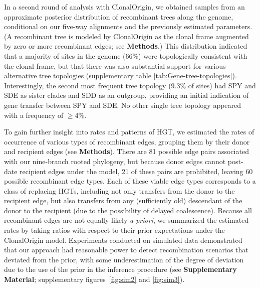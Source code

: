\documentclass[12pt]{article}
\begin{document}
In a second round of analysis with ClonalOrigin, we obtained samples from an
approximate posterior distribution of recombinant trees along the genome,
conditional on our five-way alignments and the previously estimated
parameters. (A recombinant tree is modeled by ClonalOrigin as the clonal
frame augmented by zero or more recombinant edges; see \textbf{Methods}.)
This distribution indicated that a majority of sites in the genome (66\%)
were topologically consistent with the clonal frame, but that there was
also substantial support for various alternative tree topologies (supplementary
table \ref{tab:Gene-tree-topologies}).  Interestingly, the second most
frequent tree topology (9.3\% of sites) had SPY and SDE as sister clades
and SDD as an outgroup, providing an initial indication of gene transfer
between SPY and SDE.  No other single tree topology appeared with a
frequency of $\geq$4\%.

To gain further insight into rates and patterns of HGT, we estimated the
rates of occurrence of various types of recombinant edges, grouping them by
their donor and recipient edges (see \textbf{Methods}).  There are 81
possible edge pairs associated with our nine-branch rooted phylogeny, but
because donor edges cannot post-date recipient edges under the model, 21 of
these pairs are prohibited, leaving 60 possible recombinant edge types.
Each of these viable edge types corresponds to a class of replacing HGTs,
including not only transfers from the donor to the recipient edge, but also
transfers from any (sufficiently old) descendant of the donor to the
recipient (due to the possibility of delayed coalescence).  Because all
recombinant edges are not equally likely \textit{a priori}, we summarized
the estimated rates by taking ratios with respect to their prior
expectations under the ClonalOrigin model.  Experiments conducted on
simulated data demonstrated that our approach had reasonable power to
detect recombination scenarios that deviated from the prior, with some
underestimation of the degree of deviation due to the use of the prior in
the inference procedure 
(see \textbf{Supplementary Material};
supplementary figures\ \ref{fig:sim2} and \ref{fig:sim3}).
\end{document}
